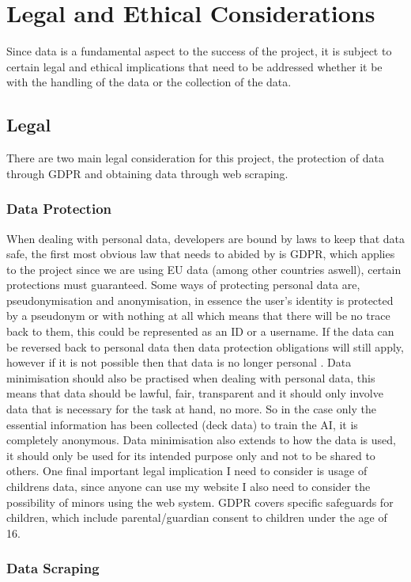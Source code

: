 \documentclass{report} %
\begin{document}
\chapter{Legal and Ethical Considerations}
Since data is a fundamental aspect to the success of the project, it is subject to certain legal and ethical implications that need to be addressed whether it be with the handling of the data or the collection of the data.
\section{Legal}
There are two main legal consideration for this project, the protection of data through GDPR and obtaining data through web scraping.
\subsection{Data Protection}
When dealing with personal data, developers are bound by laws to keep that data safe, the first most obvious law that needs to abided by is GDPR, which applies to the project since we are using EU data (among other countries aswell), certain protections must guaranteed. Some ways of protecting personal data are, pseudonymisation and anonymisation, in essence the user’s identity is protected by a pseudonym or with nothing at all which means that there will be no trace back to them, this could be represented as an ID or a username. If the data can be reversed back to personal data then data protection obligations will still apply, however if it is not possible then that data is no longer personal \cite{Euro2018}. Data minimisation should also be practised when dealing with personal data, this means that data should be lawful, fair, transparent and it should only involve data that is necessary for the task at hand, no more. So in the case only the essential information has been collected (deck data) to train the AI, it is completely anonymous. Data minimisation also extends to how the data is used, it should only be used for its intended purpose only and not to be shared to others. One final important legal implication I need to consider is usage of childrens data, since anyone can use my website I also need to consider the possibility of minors using the web system. GDPR covers specific safeguards for children, which include parental/guardian consent to children under the age of 16.

\subsection{Data Scraping}
\end{document}
